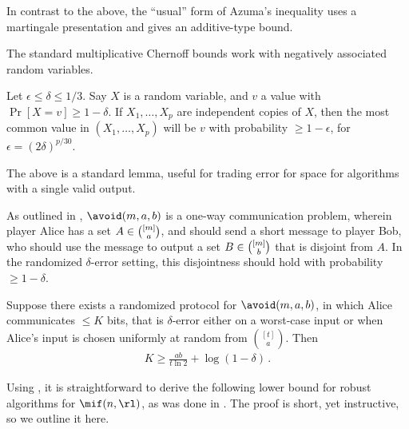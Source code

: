 \begin{itemize}
\begin{itemize}
\noindent In contrast to the above, the ``usual'' form of Azuma's inequality uses a
martingale presentation and gives an additive-type bound.

\begin{lemma}\label{lem:chernoff-neg-assoc} The standard multiplicative Chernoff bounds work with negatively associated random variables.
\end{lemma}

\begin{lemma}\label{lem:error-reduction-by-vote}
  Let $\epsilon \le \delta \le 1/3$. Say $X$ is a random variable, and $v$ a value with $\Pr[X = v] \ge 1 - \delta$. If $X_1,\ldots,X_p$ are independent copies of $X$, then the most common value in $(X_1,\ldots,X_p)$ will be $v$ with probability $\ge 1 - \epsilon$, for $\epsilon = \left(2\delta\right)^{p / 30}$.
\end{lemma}

\noindent The above is a standard lemma, useful for trading error for space
for algorithms with a single valid output.

As outlined in , $\avoid(m,a,b)$ is a one-way
communication problem, wherein player Alice has a set $A \in
\smash{\binom{[m]}{a}}$, and should send a short message to player Bob, who
should use the message to output a set $B \in \smash{\binom{[m]}{b}}$ that is
disjoint from $A$. In the randomized $\delta$-error setting, this disjointness
should hold with probability $\ge 1-\delta$.

\begin{theorem}\label{lem:avoid-lb}
  Suppose there exists a randomized protocol for $\avoid(m,a,b)$, in which
  Alice communicates $\le K$ bits, that is $\delta$-error either on a
  worst-case input or when Alice's input is chosen uniformly at random from
  $\binom{[t]}{a}$. Then
  \begin{align*}
    K \ge \frac{a b}{t \ln 2} + \log(1-\delta) \,.
  \end{align*}
\end{theorem}

Using , it is straightforward to derive the following lower
bound for robust algorithms for $\mif(n,\rl)$, as was done in
\cite{Stoeckl23}. The proof is short, yet instructive, so we outline it here.


\end{itemize}
\end{itemize}
